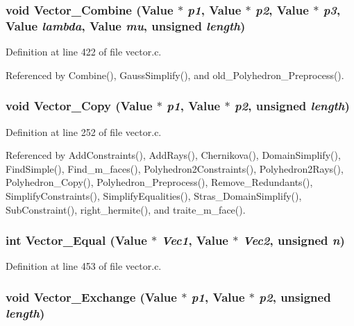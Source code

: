 \subsubsection{\setlength{\rightskip}{0pt plus 5cm}void Vector\_\-Combine (Value $\ast$ {\em p1}, Value $\ast$ {\em p2}, Value $\ast$ {\em p3}, Value {\em lambda}, Value {\em mu}, unsigned {\em length})}\label{vector_8c_a20}




Definition at line 422 of file vector.c.

Referenced by Combine(), Gauss\-Simplify(), and old\_\-Polyhedron\_\-Preprocess().

\subsubsection{\setlength{\rightskip}{0pt plus 5cm}void Vector\_\-Copy (Value $\ast$ {\em p1}, Value $\ast$ {\em p2}, unsigned {\em length})}\label{vector_8c_a11}




Definition at line 252 of file vector.c.

Referenced by Add\-Constraints(), Add\-Rays(), Chernikova(), Domain\-Simplify(), Find\-Simple(), Find\_\-m\_\-faces(), Polyhedron2Constraints(), Polyhedron2Rays(), Polyhedron\_\-Copy(), Polyhedron\_\-Preprocess(), Remove\_\-Redundants(), Simplify\-Constraints(), Simplify\-Equalities(), Stras\_\-Domain\-Simplify(), Sub\-Constraint(), right\_\-hermite(), and traite\_\-m\_\-face().

\subsubsection{\setlength{\rightskip}{0pt plus 5cm}int Vector\_\-Equal (Value $\ast$ {\em Vec1}, Value $\ast$ {\em Vec2}, unsigned {\em n})}\label{vector_8c_a21}




Definition at line 453 of file vector.c.
\subsubsection{\setlength{\rightskip}{0pt plus 5cm}void Vector\_\-Exchange (Value $\ast$ {\em p1}, Value $\ast$ {\em p2}, unsigned {\em length})}\label{vector_8c_a10}




